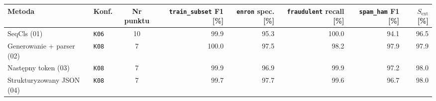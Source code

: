 \begin{tabular}{llcrrrrr}
\hline
\textbf{Metoda} & \textbf{Konf.} & \textbf{Nr punktu} & \textbf{\texttt{train\_subset} F1 [\%]} & \textbf{\texttt{enron} spec. [\%]} & \textbf{\texttt{fraudulent} recall [\%]} & \textbf{\texttt{spam\_ham} F1 [\%]} & \textbf{\(S_{\mathrm{ext}}\) [\%]} \\
\hline
SeqCls (01) & \texttt{K06} & 10 & 99.9 & 95.3 & 100.0 & 94.1 & 96.5 \\
Generowanie + parser (02) & \texttt{K08} & 7 & 100.0 & 97.5 & 98.2 & 97.9 & 97.9 \\
Następny token (03) & \texttt{K08} & 7 & 99.9 & 96.9 & 99.9 & 97.2 & 98.0 \\
Strukturyzowany JSON (04) & \texttt{K08} & 7 & 99.7 & 97.7 & 99.6 & 96.7 & 98.0 \\
\hline
\end{tabular}
